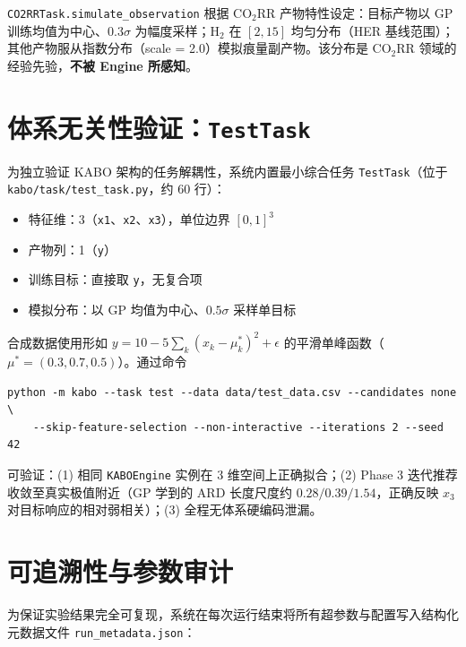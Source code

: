 \documentclass[12pt,a4paper]{article}
\newcommand{\brk}{\discretionary{}{}{}}
\begin{document}
\texttt{CO2RRTask.simulate\_observation} 根据 CO$_2$RR 产物特性设定：目标产物以 GP 训练均值为中心、$0.3\sigma$ 为幅度采样；H$_2$ 在 $[2, 15]$ 均匀分布（HER 基线范围）；其他产物服从指数分布（scale = 2.0）模拟痕量副产物。该分布是 CO$_2$RR 领域的经验先验，\textbf{不被 Engine 所感知}。


\section{体系无关性验证：\texttt{TestTask}}

为独立验证 KABO 架构的任务解耦性，系统内置最小综合任务 \texttt{TestTask}（位于 \texttt{kabo/task/\brk test\_task.py}，约 60 行）：

\begin{itemize}
    \item 特征维：3（\texttt{x1}、\texttt{x2}、\texttt{x3}），单位边界 $[0, 1]^3$
    \item 产物列：1（\texttt{y}）
    \item 训练目标：直接取 \texttt{y}，无复合项
    \item 模拟分布：以 GP 均值为中心、$0.5\sigma$ 采样单目标
\end{itemize}

合成数据使用形如 $y = 10 - 5 \sum_k (x_k - \mu_k^*)^2 + \epsilon$ 的平滑单峰函数（$\mu^* = (0.3, 0.7, 0.5)$）。通过命令

\begin{verbatim}
python -m kabo --task test --data data/test_data.csv --candidates none \
    --skip-feature-selection --non-interactive --iterations 2 --seed 42
\end{verbatim}

可验证：(1) 相同 \texttt{KABOEngine} 实例在 3 维空间上正确拟合；(2) Phase 3 迭代推荐收敛至真实极值附近（GP 学到的 ARD 长度尺度约 $0.28 / 0.39 / 1.54$，正确反映 $x_3$ 对目标响应的相对弱相关）；(3) 全程无体系硬编码泄漏。


\section{可追溯性与参数审计}

为保证实验结果完全可复现，系统在每次运行结束将所有超参数与配置写入结构化元数据文件 \texttt{run\_metadata.json}：
\end{document}
